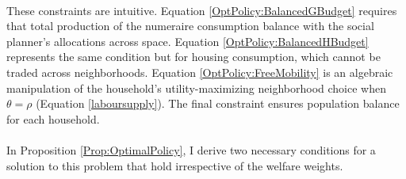 \documentclass[12pt]{article}
\begin{document}
\paragraph*{}
These constraints are intuitive. Equation \eqref{OptPolicy:BalancedGBudget} requires that total production of the numeraire consumption balance with the social planner's allocations across space. Equation \eqref{OptPolicy:BalancedHBudget} represents the same condition but for housing consumption, which cannot be traded across neighborhoods. Equation \eqref{OptPolicy:FreeMobility} is an algebraic manipulation of the household's utility-maximizing neighborhood choice when $\theta = \rho$ (Equation \ref{laboursupply}). The final constraint ensures population balance for each household. 

\paragraph*{}
In Proposition \ref{Prop:OptimalPolicy}, I derive two necessary conditions for a solution to this problem that hold irrespective of the welfare weights. 
\end{document}
